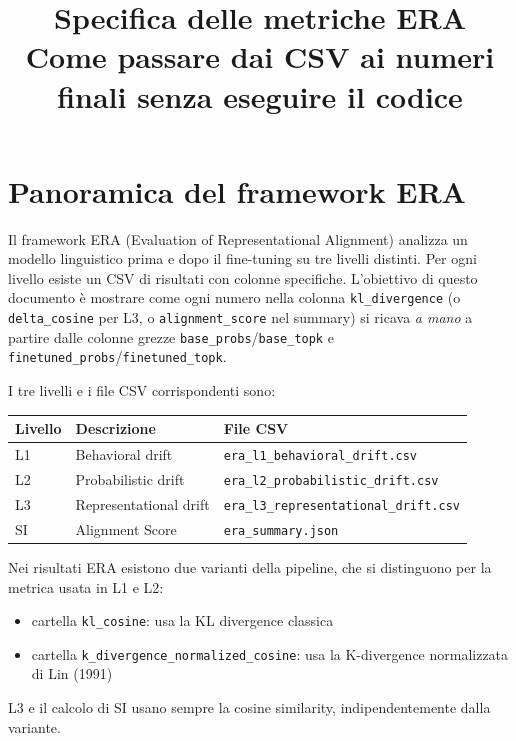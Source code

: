 \documentclass[12pt, a4paper]{article}
\title{Specifica delle metriche ERA\\
\large Come passare dai CSV ai numeri finali senza eseguire il codice}
\author{}
\date{}
\begin{document}
\maketitle

\tableofcontents
\newpage

\section{Panoramica del framework ERA}

Il framework ERA (Evaluation of Representational Alignment) analizza un modello
linguistico prima e dopo il fine-tuning su tre livelli distinti.
Per ogni livello esiste un CSV di risultati con colonne specifiche.
L'obiettivo di questo documento è mostrare come ogni numero nella colonna
\texttt{kl\_divergence} (o \texttt{delta\_cosine} per L3, o \texttt{alignment\_score}
nel summary) si ricava \emph{a mano} a partire dalle colonne grezze
\texttt{base\_probs}/\texttt{base\_topk} e
\texttt{finetuned\_probs}/\texttt{finetuned\_topk}.

\medskip
\noindent I tre livelli e i file CSV corrispondenti sono:
\begin{center}
\begin{tabular}{lll}
\toprule
Livello & Descrizione & File CSV \\
\midrule
L1 & Behavioral drift & \texttt{era\_l1\_behavioral\_drift.csv} \\
L2 & Probabilistic drift & \texttt{era\_l2\_probabilistic\_drift.csv} \\
L3 & Representational drift & \texttt{era\_l3\_representational\_drift.csv} \\
SI & Alignment Score & \texttt{era\_summary.json} \\
\bottomrule
\end{tabular}
\end{center}

Nei risultati ERA esistono due varianti della pipeline, che si distinguono
per la metrica usata in L1 e L2:
\begin{itemize}
    \item cartella \texttt{kl\_cosine}: usa la KL divergence classica
    \item cartella \texttt{k\_divergence\_normalized\_cosine}: usa la K-divergence normalizzata di Lin (1991)
\end{itemize}
L3 e il calcolo di SI usano sempre la cosine similarity, indipendentemente dalla variante.
\end{document}
